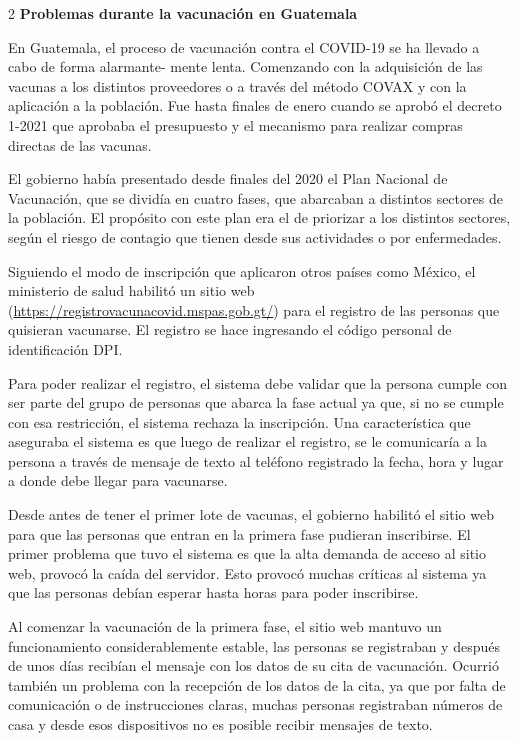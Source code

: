\documentclass[12pt,spanish,Letterpaper,openany]{book}
\begin{document}
\begin {multicols}{2}
\textbf{Problemas durante la vacunación en Guatemala}

En Guatemala, el proceso de vacunación contra el COVID-19 se ha llevado a cabo de forma alarmante-
mente lenta. Comenzando con la adquisición de las vacunas a los distintos
proveedores o a través del método COVAX y con la aplicación a la población. Fue hasta
finales de enero cuando se aprobó el decreto 1-2021 que aprobaba el presupuesto y el
mecanismo para realizar compras directas de las vacunas.

El gobierno había presentado desde finales del 2020 el Plan Nacional de Vacunación, que se
dividía en cuatro fases, que abarcaban a distintos sectores de la población. El propósito con
este plan era el de priorizar a los distintos sectores, según el riesgo de contagio que tienen
desde sus actividades o por enfermedades.

Siguiendo el modo de inscripción que aplicaron otros países como México, el ministerio de
salud habilitó un sitio web (\url{https://registrovacunacovid.mspas.gob.gt/}) para el registro de las
personas que quisieran vacunarse. El registro se hace ingresando el código personal de
identificación DPI.

Para poder realizar el registro, el sistema debe validar que la persona cumple con ser parte
del grupo de personas que abarca la fase actual ya que, si no se cumple con esa restricción,
el sistema rechaza la inscripción. Una característica que aseguraba el sistema es que luego de
realizar el registro, se le comunicaría a la persona a través de mensaje de texto al teléfono
registrado la fecha, hora y lugar a donde debe llegar para vacunarse.

Desde antes de tener el primer lote de vacunas, el gobierno habilitó el sitio web para que las
personas que entran en la primera fase pudieran inscribirse. El primer problema que tuvo el
sistema es que la alta demanda de acceso al sitio web, provocó la caída del servidor. Esto
provocó muchas críticas al sistema ya que las personas debían esperar hasta horas para poder
inscribirse.

Al comenzar la vacunación de la primera fase, el sitio web mantuvo un funcionamiento
considerablemente estable, las personas se registraban y después de unos días recibían el
mensaje con los datos de su cita de vacunación. Ocurrió también un problema con la
recepción de los datos de la cita, ya que por falta de comunicación o de instrucciones claras,
muchas personas registraban números de casa y desde esos dispositivos no es posible recibir
mensajes de texto.


\end{multicols}
\end{document}
